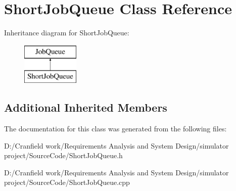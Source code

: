 \hypertarget{class_short_job_queue}{}\section{Short\+Job\+Queue Class Reference}
\label{class_short_job_queue}
Inheritance diagram for Short\+Job\+Queue\+:\begin{figure}[H]
\begin{center}
\leavevmode
\includegraphics[height=2.000000cm]{class_short_job_queue}
\end{center}
\end{figure}
\subsection*{Additional Inherited Members}


The documentation for this class was generated from the following files\+:\begin{DoxyCompactItemize}
\item 
D\+:/\+Cranfield work/\+Requirements Analysis and System Design/simulator project/\+Source\+Code/Short\+Job\+Queue.\+h\item 
D\+:/\+Cranfield work/\+Requirements Analysis and System Design/simulator project/\+Source\+Code/Short\+Job\+Queue.\+cpp\end{DoxyCompactItemize}
